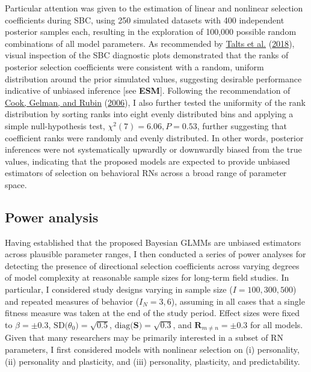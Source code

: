 \documentclass{article}
\begin{document}
Particular attention was given to the estimation of linear and nonlinear
selection coefficients during SBC, using 250 simulated datasets with 400
independent posterior samples each, resulting in the exploration of
100,000 possible random combinations of all model parameters. As
recommended by \protect\hyperlink{ref-Talts2018}{Talts et al.}
(\protect\hyperlink{ref-Talts2018}{2018}), visual inspection of the SBC
diagnostic plots demonstrated that the ranks of posterior selection
coefficients were consistent with a random, uniform distribution around
the prior simulated values, suggesting desirable performance indicative
of unbiased inference {[}see \textbf{ESM}{]}. Following the
recommendation of \protect\hyperlink{ref-Cook2006}{Cook, Gelman, and
Rubin} (\protect\hyperlink{ref-Cook2006}{2006}), I also further tested
the uniformity of the rank distribution by sorting ranks into eight
evenly distributed bins and applying a simple null-hypothesis test,
\(\chi^2(7)=6.06, P = 0.53\), further suggesting that coefficient ranks
were randomly and evenly distributed. In other words, posterior
inferences were not systematically upwardly or downwardly biased from
the true values, indicating that the proposed models are expected to
provide unbiased estimators of selection on behavioral RNs across a
broad range of parameter space.

\hypertarget{power-analysis}{%
\subsection{Power analysis}\label{power-analysis}}

Having established that the proposed Bayesian GLMMs are unbiased
estimators across plausible parameter ranges, I then conducted a series
of power analyses for detecting the presence of directional selection
coefficients across varying degrees of model complexity at reasonable
sample sizes for long-term field studies. In particular, I considered
study designs varying in sample size (\(I = 100, 300, 500\)) and
repeated measures of behavior (\(I_{N} = 3,6\)), assuming in all cases
that a single fitness measure was taken at the end of the study period.
Effect sizes were fixed to \(\beta = \pm 0.3\),
\(\mathrm{SD(}{\theta_0})=\sqrt{0.5}\),
\(\mathrm{diag({\boldsymbol{S}}})=\sqrt{0.3}\), and
\(\mathrm{\boldsymbol{R}}_{m \neq n}=\pm 0.3\) for all models. Given
that many researchers may be primarily interested in a subset of RN
parameters, I first considered models with nonlinear selection on (i)
personality, (ii) personality and plasticity, and (iii) personality,
plasticity, and predictability.
\end{document}
